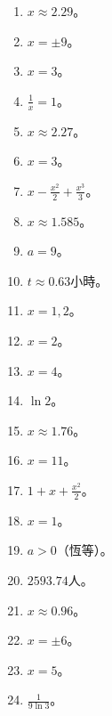 \begin{enumerate}[label=\arabic*.]
    \item $x \approx 2.29$。
    \item $x = \pm 9$。
    \item $x = 3$。
    \item $\frac{1}{x} = 1$。
    \item $x \approx 2.27$。
    \item $x = 3$。
    \item $x - \frac{x^2}{2} + \frac{x^3}{3}$。
    \item $x \approx 1.585$。
    \item $a = 9$。
    \item $t \approx 0.63$小時。
    \item $x = 1, 2$。
    \item $x = 2$。
    \item $x = 4$。
    \item $\ln 2$。
    \item $x \approx 1.76$。
    \item $x = 11$。
    \item $1 + x + \frac{x^2}{2}$。
    \item $x = 1$。
    \item $a > 0$（恆等）。
    \item $2593.74$人。
    \item $x \approx 0.96$。
    \item $x = \pm 6$。
    \item $x = 5$。
    \item $\frac{1}{9 \ln 3}$。
\end{enumerate}